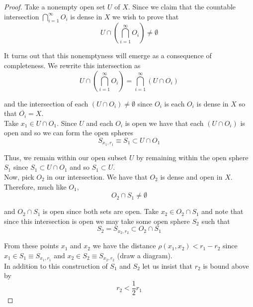 \documentclass[12pt]{article}
\newlength\tindent
\renewcommand{\indent}{\hspace*{\tindent}}
\begin{document}
\begin{proof} Take a nonempty open set $U$ of $X$. Since we claim that the countable intersection $\bigcap^\infty_{i = 1} O_i$ is dense in $X$ we wish to prove that
\begin{equation*}
	U \cap \left( \bigcap^\infty_{i = 1} O_i \right) \neq \emptyset
\end{equation*}

\indent It turns out that this nonemptyness will emerge as a consequence of completeness. We rewrite this intersection as
\begin{equation*}
	U \cap \left( \bigcap^\infty_{i = 1} O_i \right) = \bigcap^\infty_{i = 1} \left( U \cap O_i \right)
\end{equation*}

and the intersection of each $\left( U \cap O_i \right) \neq \emptyset$ since $O_i$ is each $O_i$ is dense in $X$ so that $\overline{O_i} = X$. \\

\indent Take $x_1 \in U \cap O_1$. Since $U$ and each $O_i$ is open we have that each $\left( U \cap O_i \right)$ is open and so we can form the open spheres
\begin{equation*}
	S_{x_1, r_1} \equiv S_1 \subset U \cap O_1
\end{equation*}

\indent Thus, we remain within our open subset $U$ by remaining within the open sphere $S_1$ since $S_1 \subset U \cap O_1$ and so $S_1 \subset U$. \\

\indent Now, pick $O_2$ in our intersection. We have that $O_2$ is dense and open in $X$. Therefore, much like $O_1$,
\begin{equation*}
	O_2 \cap S_1 \neq \emptyset
\end{equation*}

and $O_2 \cap S_1$ is open since both sets are open. Take $x_2 \in O_2 \cap S_1$ and note that since this intersection is open we may take some open sphere $S_2$ such that
\begin{equation*}
	S_2 = S_{x_2, r_2} \subset O_2 \cap S_1
\end{equation*}

\indent From these points $x_1$ and $x_2$ we have the distance $\rho(x_1, x_2) < r_1 - r_2$ since $x_1 \in S_1 \equiv S_{x_1, r_1}$ and $x_2 \in S_2 \equiv S_{x_2, r_2}$ (draw a diagram). \\

In addition to this construction of $S_1$ and $S_2$ let us insist that $r_2$ is bound above by
\begin{equation*}
	r_2 < \frac{1}{2}r_1
\end{equation*}


\end{proof}
\end{document}

